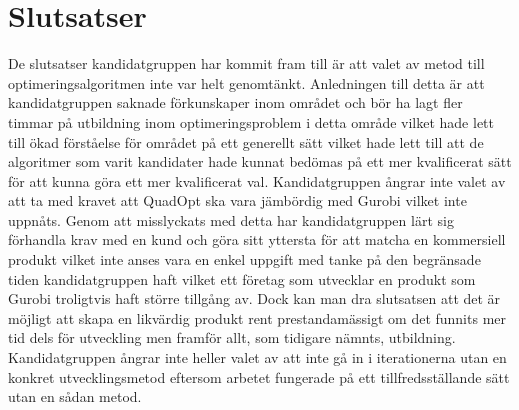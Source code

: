 \section{Slutsatser}
De slutsatser kandidatgruppen har kommit fram till är att valet av metod till optimeringsalgoritmen inte var helt genomtänkt. Anledningen till detta är att kandidatgruppen saknade förkunskaper inom området och bör ha lagt fler timmar på utbildning inom optimeringsproblem i detta område vilket hade lett till ökad förståelse för området på ett generellt sätt vilket hade lett till att de algoritmer som varit kandidater hade kunnat bedömas på ett mer kvalificerat sätt för att kunna göra ett mer kvalificerat val. 
\newline
\newline
Kandidatgruppen ångrar inte valet av att ta med kravet att QuadOpt ska vara jämbördig med Gurobi vilket inte uppnåts. Genom att misslyckats med detta har kandidatgruppen lärt sig förhandla krav med en kund och göra sitt yttersta för att matcha en kommersiell produkt vilket inte anses vara en enkel uppgift med tanke på den begränsade tiden kandidatgruppen haft vilket ett företag som utvecklar en produkt som Gurobi troligtvis haft större tillgång av. Dock kan man dra slutsatsen att det är möjligt att skapa en likvärdig produkt rent prestandamässigt om det funnits mer tid dels för utveckling men framför allt, som tidigare nämnts, utbildning.
\newline
\newline
Kandidatgruppen ångrar inte heller valet av att inte gå in i iterationerna utan en konkret utvecklingsmetod eftersom arbetet fungerade på ett tillfredsställande sätt utan en sådan metod.  
